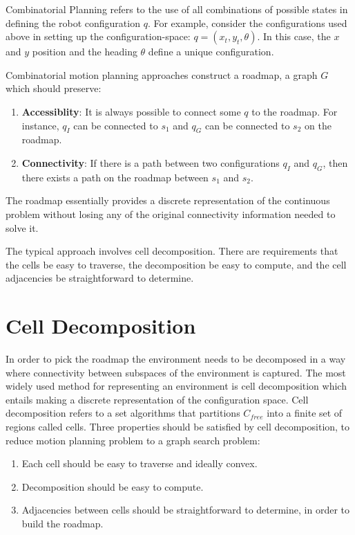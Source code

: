 \documentclass[twoside]{article}
\begin{document}
Combinatorial Planning refers to the use of all combinations of possible states in defining the robot configuration $q$. For example, consider the configurations used above in setting up the configuration-space: $q = (x_t, y_t, \theta)$. In this case, the $x$ and $y$ position and the heading $\theta$ define a unique configuration.

Combinatorial motion planning approaches construct a roadmap, a graph $G$ which should preserve:

\begin{enumerate}
	\item \textbf{Accessiblity}: It is always possible to connect some $q$ to the roadmap. For instance, $q_I$ can be connected to $s_1$ and $q_G$ can be connected to $s_2$ on the roadmap.
	\item \textbf{Connectivity}: If there is a path between two configurations $q_I$ and $q_G$, then there exists a path on the roadmap between $s_1$ and $s_2$.
\end{enumerate}

The roadmap essentially provides a discrete representation of the continuous problem without losing any of the original connectivity information needed to solve it.

The typical approach involves cell decomposition. There are requirements that the cells be easy to traverse, the decomposition be easy to compute, and the cell adjacencies be straightforward to determine.

\section{Cell Decomposition} \label{Cell Decomposition}
In order to pick the roadmap the environment needs to be decomposed in a way where connectivity between subspaces of the environment is captured. The most widely used method for representing an environment is cell decomposition which entails making a discrete representation of the configuration space. Cell decomposition refers to a set algorithms that partitions $C_{free}$ into a finite set of regions called cells. Three properties should be satisfied by cell decomposition, to reduce motion planning problem to a graph search problem:

\begin{enumerate}
\item Each cell should be easy to traverse and ideally convex.
\item Decomposition should be easy to compute.
\item Adjacencies between cells should be straightforward to determine, in order to build the roadmap.
\end{enumerate}
\end{document}
